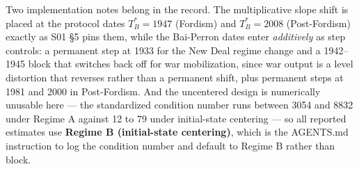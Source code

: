 \documentclass[11pt,a4paper]{article}
\begin{document}
Two implementation notes belong in the record. The multiplicative slope shift is placed at the protocol dates $T_B^* = 1947$ (Fordism) and $T_B^* = 2008$ (Post-Fordism) exactly as S01 \S5 pins them, while the Bai-Perron dates enter \textit{additively} as step controls: a permanent step at 1933 for the New Deal regime change and a 1942--1945 block that switches back off for war mobilization, since war output is a level distortion that reverses rather than a permanent shift, plus permanent steps at 1981 and 2000 in Post-Fordism. And the uncentered design is numerically unusable here --- the standardized condition number runs between 3054 and 8832 under Regime A against 12 to 79 under initial-state centering --- so all reported estimates use \textbf{Regime B (initial-state centering)}, which is the AGENTS.md instruction to log the condition number and default to Regime B rather than block.
\end{document}
